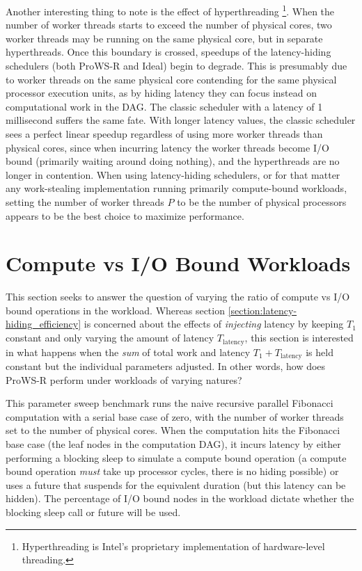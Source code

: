 \documentclass[bsc,frontabs,singlespacing,parskip,deptreport,normalheadings]{infthesis}
\begin{document}
Another interesting thing to note is the effect of hyperthreading
\footnote{Hyperthreading is Intel's proprietary implementation of hardware-level
threading.}. When the number of worker threads starts to exceed the number of
physical cores, two worker threads may be running on the same physical core, but
in separate hyperthreads. Once this boundary is crossed, speedups of the
latency-hiding schedulers (both ProWS-R and Ideal) begin to degrade. This is
presumably due to worker threads on the same physical core contending for the
same physical processor execution units, as by hiding latency they can focus
instead on computational work in the DAG. The classic scheduler with a latency
of 1 millisecond suffers the same fate. With longer latency values, the classic
scheduler sees a perfect linear speedup regardless of using more worker threads
than physical cores, since when incurring latency the worker threads become I/O
bound (primarily waiting around doing nothing), and the hyperthreads are no
longer in contention. When using latency-hiding schedulers, or for that matter
any work-stealing implementation running primarily compute-bound workloads,
setting the number of worker threads \(P\) to be the number of physical
processors appears to be the best choice to maximize performance.

\section{Compute vs I/O Bound Workloads}
\label{section:compute_vs_i/o_bound_workloads}

This section seeks to answer the question of varying the ratio of compute vs I/O
bound operations in the workload. Whereas section
\ref{section:latency-hiding_efficiency} is concerned about the effects of
\textit{injecting} latency by keeping \(T_1\) constant and only varying the
amount of latency \(T_\text{latency}\), this section is interested in what
happens when the \textit{sum} of total work and latency \(T_1 +
T_\text{latency}\) is held constant but the individual parameters adjusted. In
other words, how does ProWS-R perform under workloads of varying natures?

This parameter sweep benchmark runs the naive recursive parallel Fibonacci
computation with a serial base case of zero, with the number of worker threads
set to the number of physical cores. When the computation hits the Fibonacci
base case (the leaf nodes in the computation DAG), it incurs latency by either
performing a blocking sleep to simulate a compute bound operation (a compute
bound operation \textit{must} take up processor cycles, there is no hiding
possible) or uses a future that suspends for the equivalent duration (but this
latency can be hidden). The percentage of I/O bound nodes in the workload
dictate whether the blocking sleep call or future will be used.
\end{document}
